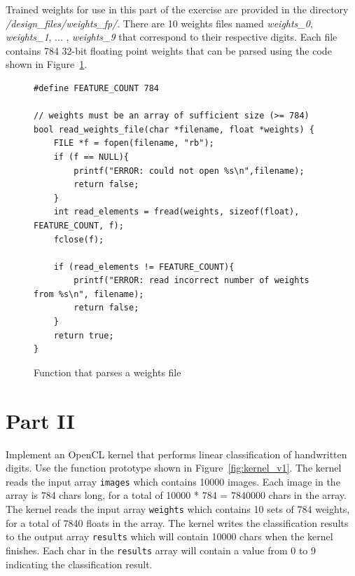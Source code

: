 \documentclass[epsfig,10pt,fullpage]{article}
\begin{document}
Trained weights for use in this part of the exercise are provided in the directory \textit{/design\_files/weights\_fp/}. There are 10 weights files named 
\textit{weights\_0}, \textit{weights\_1}, ... , \textit{weights\_9} that correspond to their respective digits.
Each file contains 784 32-bit floating point weights that can be parsed using the code shown in 
Figure~\ref{fig:parse_weights_code}. 

\lstset{language=C++}
\begin{figure}[H]
\begin{center}
\begin{minipage}[t]{16 cm}
\begin{lstlisting}
#define FEATURE_COUNT 784

// weights must be an array of sufficient size (>= 784)
bool read_weights_file(char *filename, float *weights) {
	FILE *f = fopen(filename, "rb");
	if (f == NULL){
		printf("ERROR: could not open %s\n",filename);
		return false;
	}
	int read_elements = fread(weights, sizeof(float), FEATURE_COUNT, f);
	fclose(f);
	
	if (read_elements != FEATURE_COUNT){
		printf("ERROR: read incorrect number of weights from %s\n", filename);
		return false;
	}
	return true;
}
\end{lstlisting}
\end{minipage}
\end{center}
\vspace{-0.33in}\caption{Function that parses a weights file}
\label{fig:parse_weights_code}
\end{figure}

\section*{Part II}

Implement an OpenCL kernel that performs linear classification of handwritten digits. Use the function prototype shown in Figure~\ref{fig:kernel_v1}. 
The kernel reads the input array \texttt{images} which contains 10000 images. Each image in the array is 784 chars long, for a total of 10000 * 784 = 7840000 chars in the array.
The kernel reads the input array \texttt{weights} which contains 10 sets of 784 weights, for a total of 7840 floats in the array. 
The kernel writes the classification results to the output array \texttt{results} which will contain 10000 chars when the kernel finishes.
Each char in the \texttt{results} array will contain a value from 0 to 9 indicating the classification result.
\end{document}
